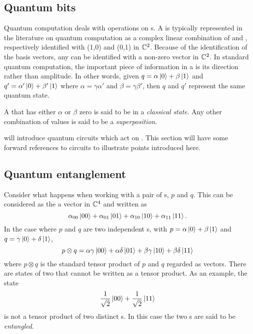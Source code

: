 \subsection{Quantum bits} %
\label{sub:quantum_bits}

Quantum computation deals with operations on \qubit{}s. A \qubit{} is typically
represented in the literature on quantum computation as a complex
linear combination of  and , respectively
identified with (1,0) and (0,1) in $\mathbb{C}^2$. Because of the
identification of the basis vectors, any \qubit{} can be identified
with a non-zero vector in $\mathbb{C}^2$.
In standard quantum computation, the important piece of
 information in a \qubit{} is its direction rather than
amplitude. In other words, given $q=\alpha\left\vert{0}\right\rangle+\beta\left\vert{1}\right\rangle$ and
$q'=\alpha'\left\vert{0}\right\rangle+\beta'\left\vert{1}\right\rangle$
where $\alpha = \gamma\alpha'$ and
$\beta = \gamma\beta'$, then $q$ and $q'$ represent the same
quantum state.



A \qubit{} that has either $\alpha$ or $\beta$ zero is said to be in
a \emph{classical state}. Any other combination of values is said to be a
\emph{superposition}.

 will introduce quantum circuits
which act on \qubits{}. This section will have some forward
references to circuits to illustrate points introduced here.


\subsection{Quantum entanglement} %
\label{sub:quantum_entanglement}

Consider what happens when working with a pair of \qubit{}s, $p$ and $q$.
This can be considered as the a vector in $\mathbb{C}^4$ and written as
\begin{equation}
\alpha_{00}\left\vert{00}\right\rangle+\alpha_{01}\left\vert{01}\right\rangle+\alpha_{10}\left\vert{10}\right\rangle+
\alpha_{11}\left\vert{11}\right\rangle.\label{eq:appTwoqubits}
\end{equation}
In the case where $p$ and $q$
are two independent \qubit{}s, with $p=\alpha\left\vert{0}\right\rangle+\beta\left\vert{1}\right\rangle$
and $q=\gamma\left\vert{0}\right\rangle+\delta\left\vert{1}\right\rangle$,
\begin{equation}
p \otimes q = \alpha\gamma\left\vert{00}\right\rangle+\alpha\delta\left\vert{01}\right\rangle+\beta\gamma\left\vert{10}\right\rangle+
\beta\delta\left\vert{11}\right\rangle
\end{equation}
where $p \otimes q$  is the standard tensor product of
$p$ and $q$ regarded as vectors. There are states of two \qubits{}
that cannot be written as a tensor product. As an example, the state
\begin{equation}
\frac{1}{\sqrt{2}}\left\vert{00}\right\rangle +
\frac{1}{\sqrt{2}}\left\vert{11}\right\rangle\label{eq:appEntangledqubits}
\end{equation}
is not  a tensor product of two distinct \qubit{}s.
In this case the two \qubit{}s are said to be \emph{entangled}.

